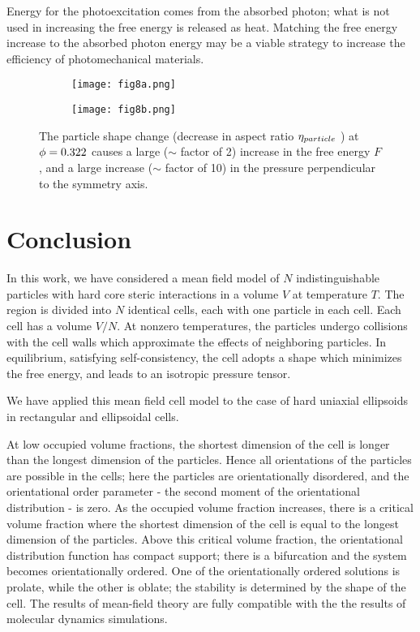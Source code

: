 \documentclass{article}
\begin{document}
Energy for the photoexcitation comes from the absorbed photon; what is not
used in increasing the free energy is released as heat. Matching the free
energy increase to the absorbed photon energy may be a viable strategy to
increase the efficiency of photomechanical materials.

\begin{figure}[h]
\centering
\begin{subfigure}[c]{0.45\linewidth}
		\centering
		\texttt{[image: fig8a.png]}
		\caption{}
		\label{fig:ppm_332_05}
	\end{subfigure}
\quad\quad 
\begin{subfigure}[c]{0.45\linewidth}
		\centering
		\texttt{[image: fig8b.png]}
		\caption{}
		\label{fig:ppm_332_09}
	\end{subfigure}
\caption{The particle shape change (decrease in aspect ratio $\protect\eta_{particle}$%
) at $\protect\phi =0.322$ causes a large ($\sim$ factor of 2) increase in the free energy $F$, and a
large increase ($\sim$ factor of 10) in the pressure perpendicular to the symmetry axis.}
\label{fig:shapes}
\end{figure}

\section{Conclusion}

\label{Sec_Conclusion}

In this work, we have considered a mean field model of $N$ indistinguishable
particles with hard core steric interactions in a volume $V$ at temperature $%
T$. The region is divided into $N$ identical cells, each with one particle
in each cell. Each cell has a volume $V/N$. At nonzero temperatures, the
particles undergo collisions with the cell walls which approximate the
effects of neighboring particles. In equilibrium, satisfying
self-consistency, the cell adopts a shape which minimizes the free energy,
and leads to an isotropic pressure tensor.

We have applied this mean field cell model to the case of hard uniaxial
ellipsoids in rectangular and ellipsoidal cells.

At low occupied volume fractions, the shortest dimension of the cell is
longer than the longest dimension of the particles. Hence all orientations
of the particles are possible in the cells; here the particles are
orientationally disordered, and the orientational order parameter - the
second moment of the orientational distribution - is zero. As the occupied
volume fraction increases, there is a critical volume fraction where the
shortest dimension of the cell is equal to the longest dimension of the
particles. Above this critical volume fraction, the orientational
distribution function has compact support; there is a bifurcation and the
system becomes orientationally ordered. One of the orientationally ordered
solutions is prolate, while the other is oblate; the stability is determined
by the shape of the cell. The results of mean-field theory are fully
compatible with the the results of molecular dynamics simulations.
\end{document}
